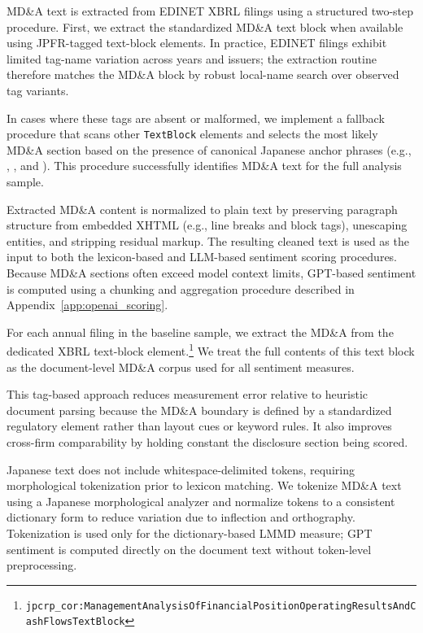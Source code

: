 MD\&A text is extracted from EDINET XBRL filings using a structured two-step procedure. First, we extract the standardized MD\&A text block when available using JPFR-tagged text-block elements. In practice, EDINET filings exhibit limited tag-name variation across years and issuers; the extraction routine therefore matches the MD\&A block by robust local-name search over observed tag variants.

In cases where these tags are absent or malformed, we implement a fallback procedure that scans other \texttt{TextBlock} elements and selects the most likely MD\&A section based on the presence of canonical Japanese anchor phrases (e.g., , , and ). This procedure successfully identifies MD\&A text for the full analysis sample.

Extracted MD\&A content is normalized to plain text by preserving paragraph structure from embedded XHTML (e.g., line breaks and block tags), unescaping entities, and stripping residual markup. The resulting cleaned text is used as the input to both the lexicon-based and LLM-based sentiment scoring procedures. Because MD\&A sections often exceed model context limits, GPT-based sentiment is computed using a chunking and aggregation procedure described in Appendix~\ref{app:openai_scoring}.

For each annual filing in the baseline sample, we extract the MD\&A from the dedicated XBRL text-block
element.\footnote{\texttt{jpcrp\_cor:\allowbreak ManagementAnalysisOfFinancialPositionOperatingResultsAndCashFlows\allowbreak TextBlock}}
We treat the full contents of this text block as the document-level MD\&A corpus used for all sentiment
measures.

This tag-based approach reduces measurement error relative to heuristic document parsing because the
MD\&A boundary is defined by a standardized regulatory element rather than layout cues or keyword rules.
It also improves cross-firm comparability by holding constant the disclosure section being scored.

Japanese text does not include whitespace-delimited tokens, requiring morphological tokenization prior to lexicon matching. We tokenize MD\&A text using a Japanese morphological analyzer and normalize tokens to a consistent dictionary form to reduce variation due to inflection and orthography. Tokenization is used only for the dictionary-based LMMD measure; GPT sentiment is computed directly on the document text without token-level preprocessing.


